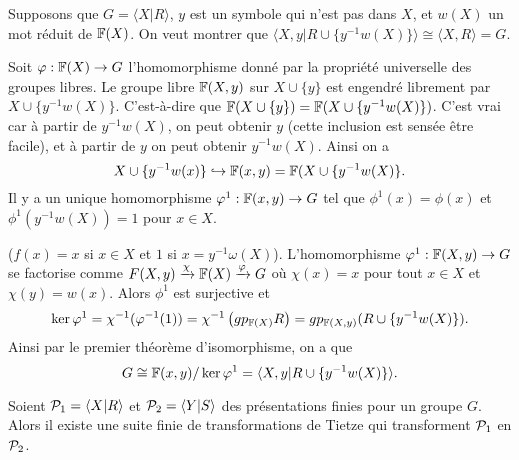    \begin{preuve}[pour $X^+$]
     Supposons que $G = \langle X | R \rangle$, $y$ est un symbole qui n'est pas dans $X$, et $w(X)$ un mot
     réduit de $\mathbb{F}(X)$. On veut montrer que $\langle X, y | R \cup \{y^{-1}w(X)\} \rangle \cong \langle X, R
     \rangle = G$. 

     Soit $\varphi : \mathbb{F}(X) \to G$ l'homomorphisme donné par la propriété universelle des groupes libres. Le
     groupe libre $\mathbb{F}(X, y)$ sur $X \cup \{y\}$ est engendré librement par $X \cup
     \{y^{-1}w(X)\}$. C'est-à-dire que $\mathbb{F}(X \cup \{y\}) = \mathbb{F}(X \cup \{y^{-1}w(X)\})$. C'est vrai car à
     partir de $y^{-1}w(X)$, on peut obtenir $y$ (cette inclusion est sensée être facile), et à partir de
     $y$ on peut obtenir $y^{-1}w(X)$. Ainsi on a
       \[X \cup \{y^{-1}w(x)\} \hookrightarrow \mathbb{F}(x,y) = \mathbb{F}(X \cup \{y^{-1}w(X)\}.\]
     Il y a un unique homomorphisme $\varphi^1: \mathbb{F}(x,y) \to G$ tel que $\phi^1(x) = \phi(x)$ et
     $\phi^1(y^{-1}w(X)) = 1$ pour $x \in X$.

     \begin{center}
     \end{center}

     ($f(x) = x$ si $x \in X$ et $1$ si $x = y^{-1} \omega(X)$). L'homomorphisme $\varphi^1: \mathbb{F}(X,y) \to G$ se factorise comme $F(X,y) \xrightarrow{\chi} \mathbb{F}(X)
     \xrightarrow{\varphi} G$ où $\chi(x) = x$ pour tout $x \in X$ et $\chi(y) = w(x)$. Alors $\phi^1$ est
     surjective et
       \[\ker \varphi^1 = \chi^{-1}(\varphi^{-1}(1)) = \chi^{-1} \left( gp_{\mathbb{F}(X)}R \right) = gp_{\mathbb{F}(X,y)}(R \cup
       \{y^{-1}w(X)\}).\]
     Ainsi par le premier théorème d'isomorphisme, on a que 
       \[G \cong \mathbb{F}(x,y)/\ker \varphi^1 = \langle X,y | R \cup \{y^{-1}w(X)\} \rangle.\]
   \end{preuve}



   \begin{theo} \label{thm:de-Tietze} 
     Soient ${\cal P}_1 = \langle X | R \rangle$ et $ {\cal P}_2 = \langle Y | S \rangle$ des présentations
     finies pour un groupe $G$. Alors il existe une suite finie de transformations de Tietze qui transforment
     ${\cal P}_1$ en ${\cal P}_2$.
   \end{theo}


